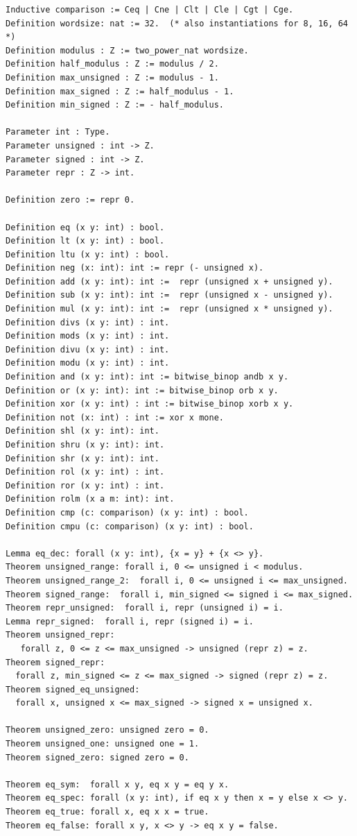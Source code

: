 \documentclass[12pt,fleqn,openany,oneside,showtrims]{memoir}
\begin{document}
\begin{lstlisting}
Inductive comparison := Ceq | Cne | Clt | Cle | Cgt | Cge.
Definition wordsize: nat := 32.  (* also instantiations for 8, 16, 64 *)
Definition modulus : Z := two_power_nat wordsize.
Definition half_modulus : Z := modulus / 2.
Definition max_unsigned : Z := modulus - 1.
Definition max_signed : Z := half_modulus - 1.
Definition min_signed : Z := - half_modulus.

Parameter int : Type.
Parameter unsigned : int -> Z.
Parameter signed : int -> Z.
Parameter repr : Z -> int.

Definition zero := repr 0.

Definition eq (x y: int) : bool.
Definition lt (x y: int) : bool.
Definition ltu (x y: int) : bool.
Definition neg (x: int): int := repr (- unsigned x).
Definition add (x y: int): int :=  repr (unsigned x + unsigned y).
Definition sub (x y: int): int :=  repr (unsigned x - unsigned y).
Definition mul (x y: int): int :=  repr (unsigned x * unsigned y).
Definition divs (x y: int) : int.
Definition mods (x y: int) : int.
Definition divu (x y: int) : int.
Definition modu (x y: int) : int.
Definition and (x y: int): int := bitwise_binop andb x y.
Definition or (x y: int): int := bitwise_binop orb x y.
Definition xor (x y: int) : int := bitwise_binop xorb x y.
Definition not (x: int) : int := xor x mone.
Definition shl (x y: int): int.
Definition shru (x y: int): int.
Definition shr (x y: int): int.
Definition rol (x y: int) : int.
Definition ror (x y: int) : int.
Definition rolm (x a m: int): int.
Definition cmp (c: comparison) (x y: int) : bool.
Definition cmpu (c: comparison) (x y: int) : bool.

Lemma eq_dec: forall (x y: int), {x = y} + {x <> y}.
Theorem unsigned_range: forall i, 0 <= unsigned i < modulus.
Theorem unsigned_range_2:  forall i, 0 <= unsigned i <= max_unsigned.
Theorem signed_range:  forall i, min_signed <= signed i <= max_signed.
Theorem repr_unsigned:  forall i, repr (unsigned i) = i.
Lemma repr_signed:  forall i, repr (signed i) = i.
Theorem unsigned_repr: 
   forall z, 0 <= z <= max_unsigned -> unsigned (repr z) = z.
Theorem signed_repr:
  forall z, min_signed <= z <= max_signed -> signed (repr z) = z.
Theorem signed_eq_unsigned:
  forall x, unsigned x <= max_signed -> signed x = unsigned x.

Theorem unsigned_zero: unsigned zero = 0.
Theorem unsigned_one: unsigned one = 1.
Theorem signed_zero: signed zero = 0.

Theorem eq_sym:  forall x y, eq x y = eq y x.
Theorem eq_spec: forall (x y: int), if eq x y then x = y else x <> y.
Theorem eq_true: forall x, eq x x = true.
Theorem eq_false: forall x y, x <> y -> eq x y = false.


\end{lstlisting}
\end{document}
